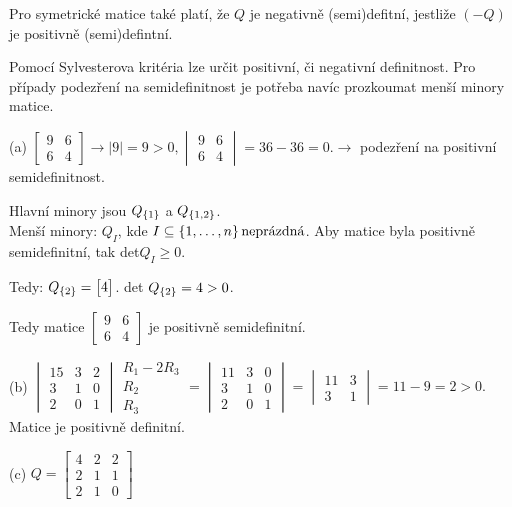 Pro symetrické matice také platí, že $Q$ je negativně (semi)defitní, jestliže $(-Q)$ je positivně (semi)defintní. 
\label{matiVlastnost}

Pomocí Sylvesterova kritéria lze určit positivní, či negativní definitnost. Pro případy podezření na semidefinitnost 
je potřeba navíc prozkoumat menší minory matice.

(a) 
$\begin{bmatrix}
    9 & 6 \\
    6 & 4
\end{bmatrix}
\rightarrow |9| = 9 > 0,
\begin{vmatrix}
    9 & 6 \\
    6 & 4
\end{vmatrix} = 36 - 36 = 0.
\rightarrow$ podezření na positivní semidefinitnost.

Hlavní minory jsou $Q_{\left\lbrace 1 \right\rbrace}$ a $Q_{\left\lbrace 1,2 \right\rbrace}$.\\
Menší minory: $Q_I$, kde $I \subseteq \left\lbrace 1, \dots, n \right\rbrace \text{neprázdná}$. Aby matice byla positivně semidefinitní, tak 
det$Q_I \geq 0$.

Tedy: $Q_{\left\lbrace 2 \right\rbrace} = 
\begin{bmatrix}
    4
\end{bmatrix}$. det $Q_{\left\lbrace 2 \right\rbrace} = 4 > 0$.

Tedy matice
$\begin{bmatrix}
    9 & 6 \\
    6 & 4
\end{bmatrix}$ je positivně semidefinitní.

(b) 
$\begin{vmatrix}
    15 & 3 & 2 \\
    3 & 1 & 0 \\
    2 & 0 & 1
\end{vmatrix}
\begin{array}{l}
    R_1 - 2 R_3 \\
    R_2 \\
    R_3
\end{array} = 
\begin{vmatrix}
    11 & 3 & 0 \\
    3 & 1 & 0 \\
    2 & 0 & 1
\end{vmatrix} = 
\begin{vmatrix}
    11 & 3 \\
    3 & 1 
\end{vmatrix} = 11-9 = 2 >0.$ Matice je positivně definitní. 

(c)
$Q = \begin{bmatrix}
    4 & 2 & 2 \\
    2 & 1 & 1 \\
    2 & 1 & 0
\end{bmatrix}$

